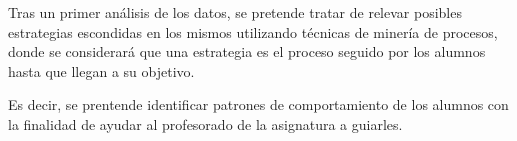 Tras un primer análisis de los datos, se pretende tratar de relevar posibles estrategias escondidas en los mismos utilizando técnicas de minería de procesos, donde se considerará que una estrategia es el proceso seguido por los alumnos hasta que llegan a su objetivo.

Es decir, se prentende identificar patrones de comportamiento de los alumnos con la finalidad de ayudar al profesorado de la asignatura a guiarles.
